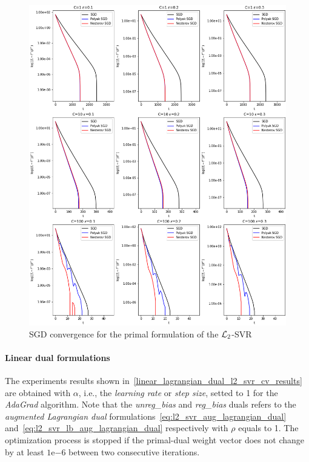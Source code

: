 

\begin{figure}[H]
	\centering
	\includegraphics[scale=0.5]{img/l2_svr_loss_history}
	\caption{SGD convergence for the primal formulation of the $\protect \mathcal{L}_2$-SVR}
	\label{fig:l2_svr_loss_history}
\end{figure}

\pagebreak

\paragraph{Linear dual formulations}

The experiments results shown in~\ref{linear_lagrangian_dual_l2_svr_cv_results} are obtained with $\alpha$, i.e., the \emph{learning rate} or \emph{step size}, setted to 1 for the \emph{AdaGrad} algorithm. Note that the \emph{unreg\_bias} and \emph{reg\_bias} duals refers to the \emph{augmented Lagrangian dual} formulations~\eqref{eq:l2_svr_aug_lagrangian_dual} and~\eqref{eq:l2_svr_lb_aug_lagrangian_dual} respectively with $\rho$ equals to 1. The optimization process is stopped if the primal-dual weight vector does not change by at least $1\mathrm{e}{-6}$  between two consecutive iterations.

